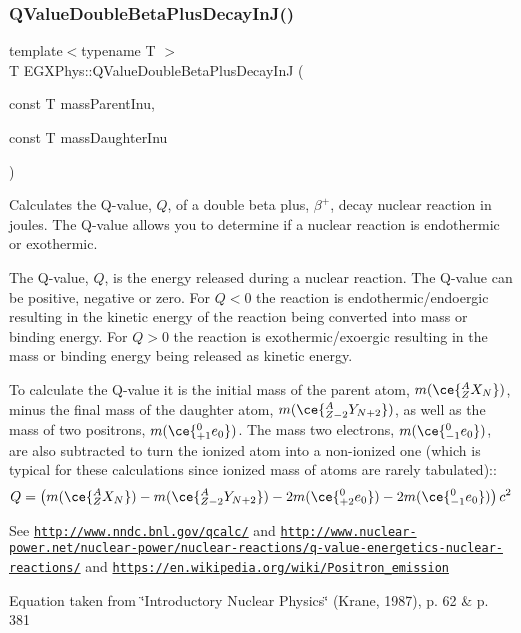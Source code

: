 \subsubsection{\texorpdfstring{Q\+Value\+Double\+Beta\+Plus\+Decay\+In\+J()}{QValueDoubleBetaPlusDecayInJ()}}
{\footnotesize\ttfamily template$<$typename T $>$ \\
T E\+G\+X\+Phys\+::\+Q\+Value\+Double\+Beta\+Plus\+Decay\+InJ (\begin{DoxyParamCaption}\item[{const T}]{mass\+Parent\+Inu,  }\item[{const T}]{mass\+Daughter\+Inu }\end{DoxyParamCaption})}



Calculates the Q-\/value, $Q$, of a double beta plus, $\beta^+$, decay nuclear reaction in joules. The Q-\/value allows you to determine if a nuclear reaction is endothermic or exothermic. 

The Q-\/value, $Q$, is the energy released during a nuclear reaction. The Q-\/value can be positive, negative or zero. For $Q < 0$ the reaction is endothermic/endoergic resulting in the kinetic energy of the reaction being converted into mass or binding energy. For $Q > 0$ the reaction is exothermic/exoergic resulting in the mass or binding energy being released as kinetic energy.

To calculate the Q-\/value it is the initial mass of the parent atom, $m(\ce{ ^{A}_{Z}X_{N} })$, minus the final mass of the daughter atom, $m(\ce{ ^{A}_{Z -2}Y_{N +2} })$, as well as the mass of two positrons, $m(\ce{ ^{0}_{+1}e_{0} })$. The mass two electrons, $m(\ce{ ^{0}_{-1}e_{0} })$, are also subtracted to turn the ionized atom into a non-\/ionized one (which is typical for these calculations since ionized mass of atoms are rarely tabulated)\+:\+: \[Q = \left ( m(\ce{ ^{A}_{Z}X_{N} })-m(\ce{ ^{A}_{Z -2}Y_{N +2} })-2m(\ce{ ^{0}_{+2}e_{0} }) - 2m(\ce{ ^{0}_{-1}e_{0} }) \right) c^2\]

See \href{http://www.nndc.bnl.gov/qcalc/}{\tt http\+://www.\+nndc.\+bnl.\+gov/qcalc/} and \href{http://www.nuclear-power.net/nuclear-power/nuclear-reactions/q-value-energetics-nuclear-reactions/}{\tt http\+://www.\+nuclear-\/power.\+net/nuclear-\/power/nuclear-\/reactions/q-\/value-\/energetics-\/nuclear-\/reactions/} and \href{https://en.wikipedia.org/wiki/Positron_emission}{\tt https\+://en.\+wikipedia.\+org/wiki/\+Positron\+\_\+emission}

Equation taken from \char`\"{}\+Introductory Nuclear Physics\char`\"{} (Krane, 1987), p. 62 \& p. 381


